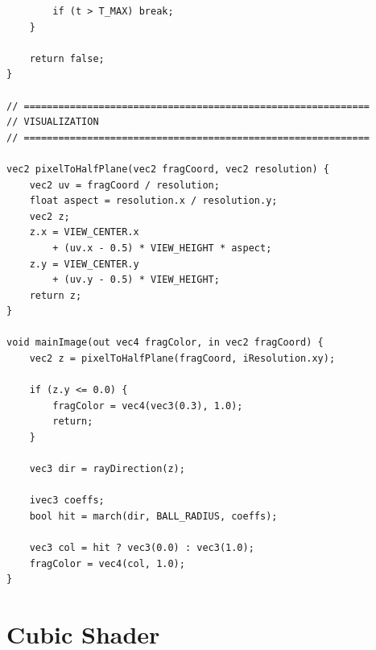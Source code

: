 \documentclass[11pt]{article}
\begin{document}
\begin{lstlisting}
        if (t > T_MAX) break;
    }

    return false;
}

// ============================================================
// VISUALIZATION
// ============================================================

vec2 pixelToHalfPlane(vec2 fragCoord, vec2 resolution) {
    vec2 uv = fragCoord / resolution;
    float aspect = resolution.x / resolution.y;
    vec2 z;
    z.x = VIEW_CENTER.x
        + (uv.x - 0.5) * VIEW_HEIGHT * aspect;
    z.y = VIEW_CENTER.y
        + (uv.y - 0.5) * VIEW_HEIGHT;
    return z;
}

void mainImage(out vec4 fragColor, in vec2 fragCoord) {
    vec2 z = pixelToHalfPlane(fragCoord, iResolution.xy);

    if (z.y <= 0.0) {
        fragColor = vec4(vec3(0.3), 1.0);
        return;
    }

    vec3 dir = rayDirection(z);

    ivec3 coeffs;
    bool hit = march(dir, BALL_RADIUS, coeffs);

    vec3 col = hit ? vec3(0.0) : vec3(1.0);
    fragColor = vec4(col, 1.0);
}
\end{lstlisting}


\section{Cubic Shader}
\label{app:cubic}
\end{document}
